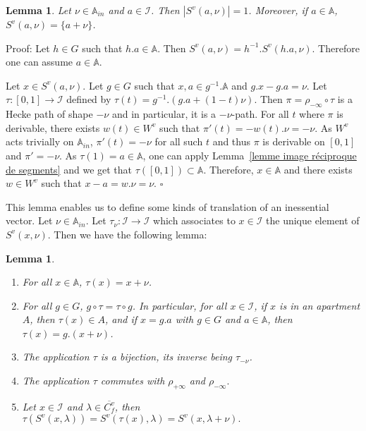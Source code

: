 \documentclass[12pt]{article}
\theoremstyle{plain}
\newtheorem{lemme}[thm]{Lemma}
\theoremstyle{definition}
\newcommand{\A}{\mathbb{A}}
\newcommand{\I}{\mathcal{I}}
\begin{document}
\begin{lemme}\label{lemme partie inessentielle}
 Let $\nu\in\A_{in}$ and $a\in \I$. Then $|S^v(a,\nu)|=1$. Moreover, if $a\in \A$, $S^v(a,\nu)=\{a+\nu\}$. 

\end{lemme} 

Proof: Let $h\in G$ such that $h.a\in \A$. Then $S^v(a,\nu)=h^{-1}.S^v(h.a,\nu)$. Therefore one can assume $a\in \A$. 

Let $x\in S^v(a,\nu)$. Let $g\in G$ such that $x,a\in g^{-1}.\A$ and $g.x-g.a=\nu$. Let $\tau:[0,1]\rightarrow \I$ defined by $\tau(t)=g^{-1}.(g.a+(1-t)\nu)$. Then $\pi=\rho_{-\infty}\circ \tau$ is a Hecke path of shape $-\nu$ and in particular,  it is a $-\nu$-path. For all $t$ where $\pi$ is derivable, there exists $w(t)\in W^v$ such that $\pi'(t)=-w(t).\nu=-\nu$. As $W^v$ acts trivially on $\A_{in}$, $\pi'(t)=-\nu$ for all such $t$ and thus $\pi$ is derivable on $[0,1]$ and $\pi'=-\nu$. As $\tau(1)=a\in \A$, one can apply Lemma~\ref{lemme image réciproque de segments} and we get that $\tau([0,1])\subset \A$. Therefore, $x\in \A$ and there exists $w\in W^v$ such that $x-a=w.\nu=\nu$. $\square$

\vspace{3mm}

This lemma enables us to define some kinds of translation of an inessential vector. Let $\nu\in \A_{in}$. Let $\tau_\nu:\I\rightarrow \I$ which associates to $x\in \I$ the unique element of $S^v(x,\nu)$. Then we have the following lemma: 

\begin{lemme}\label{lemme propriétés des translations}
\begin{enumerate}
Let $\nu\in \A_{in}$ and $\tau=\tau_\nu$. Then:

\item For all $x\in \A$, $\tau(x)=x+\nu$.\label{item tau restreint à A}

\item For all $g\in G$, $g\circ\tau=\tau\circ g$. In particular, for all $x\in \I$, if $x$ is in an apartment $A$,
 then $\tau(x)\in A$, and if $x=g.a$ with $g\in G$ and $a\in\A$, then $\tau(x)=g.(x+\nu)$.\label{item commutation de tau}

\item The application $\tau$ is a bijection, its inverse being $\tau_{-\nu}$.\label{item bijectivité des translations}


\item The application $\tau$ commutes with $\rho_{+\infty}$ and $\rho_{-\infty}.$\label{item commutation translation retraction}

\item Let $x\in \I$ and $\lambda\in \overline{C_f^v}$, then $\tau(S^v(x,\lambda))=S^v(\tau(x),\lambda)=S^v(x,\lambda+\nu).$\label{item translation d'une boule}

\end{enumerate}
\end{lemme}
\end{document}
